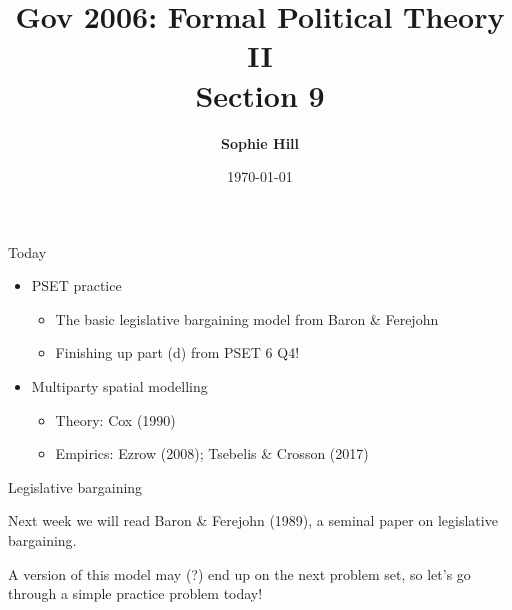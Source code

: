 \documentclass[11pt,aspectratio=169]{beamer}
\title{Gov 2006: Formal Political Theory II \\
Section 9}
\date{\today}
\author{ \textbf{Sophie Hill}}
\begin{document}
  \maketitle
  
\begin{frame}{Today}

\Large

\begin{itemize}
\setlength{\itemsep}{1em}
\item PSET practice 
\begin{itemize}
\large
\item The basic legislative bargaining model from Baron \& Ferejohn
\item Finishing up part (d) from PSET 6 Q4!
\end{itemize}
\item Multiparty spatial modelling 
\begin{itemize}
\large
\item Theory: Cox (1990)
\item Empirics: Ezrow (2008); Tsebelis \& Crosson (2017)
\end{itemize}
\end{itemize}

\end{frame}
\begin{frame}{Legislative bargaining}

Next week we will read Baron \& Ferejohn (1989), a seminal paper on \alert{legislative bargaining}.

\vspace{1em}

A version of this model may (?) end up on the next problem set, so let's go through a simple practice problem today!

\end{frame}
\end{document}
